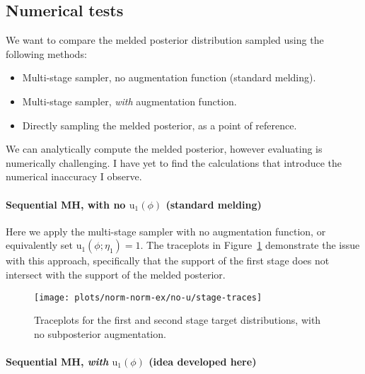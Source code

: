\documentclass[10pt,a4paper,]{article}
\providecommand{\tightlist}{%
  \setlength{\itemsep}{0pt}\setlength{\parskip}{0pt}}
\let\oldparagraph\paragraph
\renewcommand{\paragraph}[1]{\oldparagraph{#1}\mbox{}}
\newcommand{\tarw}{\text{u}}
\begin{document}
\subsection{Numerical tests}\label{numerical-tests}

We want to compare the melded posterior distribution sampled using the
following methods:

\begin{itemize}
\tightlist
\item
  Multi-stage sampler, no augmentation function (standard melding).
\item
  Multi-stage sampler, \emph{with} augmentation function.
\item
  Directly sampling the melded posterior, as a point of reference.
\end{itemize}

We can analytically compute the melded posterior, however evaluating is
numerically challenging. I have yet to find the calculations that
introduce the numerical inaccuracy I observe.

\paragraph{\texorpdfstring{Sequential MH, with no \(\text{u}_{1}(\phi)\)
(standard
melding)}{Sequential MH, with no \textbackslash{}text\{u\}\_\{1\}(\textbackslash{}phi) (standard melding)}}\label{sequential-mh-with-no-textu_1phi-standard-melding}

Here we apply the multi-stage sampler with no augmentation function, or
equivalently set \(\tarw_{1}(\phi; \eta_{1}) = 1\). The traceplots in
Figure~\ref{fig:no_u_traces} demonstrate the issue with this approach,
specifically that the support of the first stage does not intersect with
the support of the melded posterior.

\begin{figure}

{\centering \texttt{[image: plots/norm-norm-ex/no-u/stage-traces]} 

}

\caption{Traceplots for the first and second stage target distributions, with no subposterior augmentation.}\label{fig:no_u_traces}
\end{figure}

\paragraph{\texorpdfstring{Sequential MH, \emph{with}
\(\text{u}_{1}(\phi)\) (idea developed
here)}{Sequential MH, with \textbackslash{}text\{u\}\_\{1\}(\textbackslash{}phi) (idea developed here)}}\label{sequential-mh-with-textu_1phi-idea-developed-here}
\end{document}
